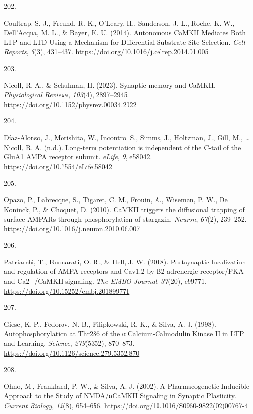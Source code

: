 \documentclass[
  11pt,
  letterpaper,
]{scrreprt}
\newlength{\cslhangindent}
\newlength{\csllabelwidth}
\newenvironment{CSLReferences}[2] %
 {\begin{list}{}{%
  \setlength{\itemindent}{0pt}
  \setlength{\leftmargin}{0pt}
  \setlength{\parsep}{0pt}
  \ifodd #1
   \setlength{\leftmargin}{\cslhangindent}
   \setlength{\itemindent}{-1\cslhangindent}
  \fi
  \setlength{\itemsep}{#2\baselineskip}}}
 {\end{list}}
\newcommand{\CSLLeftMargin}[1]{\parbox[t]{\csllabelwidth}{\strut#1\strut}}
\newcommand{\CSLRightInline}[1]{\parbox[t]{\linewidth - \csllabelwidth}{\strut#1\strut}}
\begin{document}
\begin{CSLReferences}{0}{0}
\CSLLeftMargin{202. }%
\CSLRightInline{Coultrap, S. J., Freund, R. K., O'Leary, H., Sanderson,
J. L., Roche, K. W., Dell'Acqua, M. L., \& Bayer, K. U. (2014).
Autonomous {CaMKII Mediates Both LTP} and {LTD Using} a {Mechanism} for
{Differential Substrate Site Selection}. \emph{Cell Reports},
\emph{6}(3), 431--437.
\url{https://doi.org/10.1016/j.celrep.2014.01.005}}

\CSLLeftMargin{203. }%
\CSLRightInline{Nicoll, R. A., \& Schulman, H. (2023). Synaptic memory
and {CaMKII}. \emph{Physiological Reviews}, \emph{103}(4), 2897--2945.
\url{https://doi.org/10.1152/physrev.00034.2022}}

\CSLLeftMargin{204. }%
\CSLRightInline{Díaz-Alonso, J., Morishita, W., Incontro, S., Simms, J.,
Holtzman, J., Gill, M., \ldots{} Nicoll, R. A. (n.d.). Long-term
potentiation is independent of the {C-tail} of the {GluA1 AMPA} receptor
subunit. \emph{eLife}, \emph{9}, e58042.
\url{https://doi.org/10.7554/eLife.58042}}

\CSLLeftMargin{205. }%
\CSLRightInline{Opazo, P., Labrecque, S., Tigaret, C. M., Frouin, A.,
Wiseman, P. W., De Koninck, P., \& Choquet, D. (2010). {CaMKII} triggers
the diffusional trapping of surface {AMPARs} through phosphorylation of
stargazin. \emph{Neuron}, \emph{67}(2), 239--252.
\url{https://doi.org/10.1016/j.neuron.2010.06.007}}

\CSLLeftMargin{206. }%
\CSLRightInline{Patriarchi, T., Buonarati, O. R., \& Hell, J. W. (2018).
Postsynaptic localization and regulation of {AMPA} receptors and
{Cav1}.2 by Β2 adrenergic receptor/{PKA} and {Ca2}+/{CaMKII} signaling.
\emph{The EMBO Journal}, \emph{37}(20), e99771.
\url{https://doi.org/10.15252/embj.201899771}}

\CSLLeftMargin{207. }%
\CSLRightInline{Giese, K. P., Fedorov, N. B., Filipkowski, R. K., \&
Silva, A. J. (1998). Autophosphorylation at {Thr286} of the α
{Calcium-Calmodulin Kinase II} in {LTP} and {Learning}. \emph{Science},
\emph{279}(5352), 870--873.
\url{https://doi.org/10.1126/science.279.5352.870}}

\CSLLeftMargin{208. }%
\CSLRightInline{Ohno, M., Frankland, P. W., \& Silva, A. J. (2002). A
{Pharmacogenetic Inducible Approach} to the {Study} of {NMDA}/{αCaMKII
Signaling} in {Synaptic Plasticity}. \emph{Current Biology},
\emph{12}(8), 654--656.
\url{https://doi.org/10.1016/S0960-9822(02)00767-4}}


\end{CSLReferences}
\end{document}
